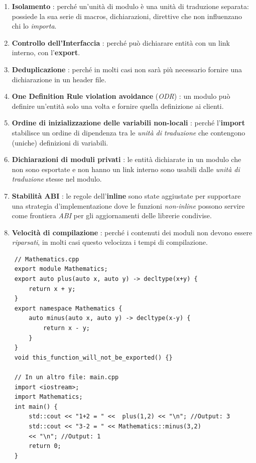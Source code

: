 \begin{enumerate}
	\item \textsf{\small \textbf{Isolamento} : perché un'unità di modulo è una unità di traduzione separata: possiede la sua serie di macros, dichiarazioni, direttive che non influenzano chi lo \emph{importa}.}
	\item \textsf{\small \textbf{Controllo dell'Interfaccia} : perché può dichiarare entità con un link interno, con l'\textbf{export}.}
	\item \textsf{\small \textbf{Deduplicazione} : perché in molti casi non sarà più necessario fornire una dichiarazione in un header file.}
	\item \textsf{\small \textbf{One Definition Rule violation avoidance} (\emph{ODR}) : un modulo può definire un'entità solo una volta e fornire quella definizione ai clienti.}
	\item \textsf{\small \textbf{Ordine di inizializzazione delle variabili non-locali} : perché l'\textbf{import} stabilisce un ordine di dipendenza tra le \emph{unità di traduzione} che contengono (uniche) definizioni di variabili.}
	\item \textsf{\small \textbf{Dichiarazioni di moduli privati} : le entità dichiarate in un modulo che non sono esportate e non hanno un link interno sono usabili dalle \emph{unità di traduzione} stesse nel modulo.}
	\item \textsf{\small \textbf{Stabilità ABI} : le regole dell'\textbf{inline} sono state aggiustate per supportare una strategia d'implementazione dove le funzioni \emph{non-inline} possono servire come frontiera \emph{ABI} per gli aggiornamenti delle librerie condivise.}
	\item \textsf{\small \textbf{Velocità di compilazione} : perché i contenuti dei moduli non devono essere \emph{riparsati}, in molti casi questo velocizza i tempi di compilazione.}
\end{enumerate}

\begin{lstlisting}
	// Mathematics.cpp
	export module Mathematics;
	export auto plus(auto x, auto y) -> decltype(x+y) {
		return x + y;
	}
	export namespace Mathematics {
		auto minus(auto x, auto y) -> decltype(x-y) {
			return x - y;  
		}   
	}
	void this_function_will_not_be_exported() {}
	
	// In un altro file: main.cpp
	import <iostream>;
	import Mathematics;
	int main() {
		std::cout << "1+2 = " <<  plus(1,2) << "\n"; //Output: 3
		std::cout << "3-2 = " << Mathematics::minus(3,2) 
		<< "\n"; //Output: 1
		return 0;
	}
\end{lstlisting}


